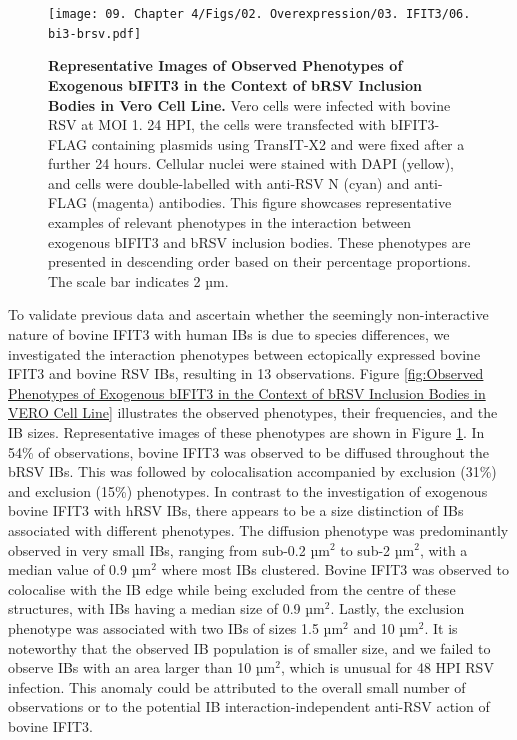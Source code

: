 \begin{figure}
    \centering
    \texttt{[image: 09. Chapter 4/Figs/02. Overexpression/03. IFIT3/06. bi3-brsv.pdf]}
    \caption[Representative Images of Observed Phenotypes of Exogenous bIFIT3 in the Context of bRSV Inclusion Bodies in Vero Cell Line.]{\textbf{Representative Images of Observed Phenotypes of Exogenous bIFIT3 in the Context of bRSV Inclusion Bodies in Vero Cell Line.} Vero cells were infected with bovine RSV at MOI 1. 24 HPI, the cells were transfected with bIFIT3-FLAG containing plasmids using TransIT-X2 and were fixed after a further 24 hours. Cellular nuclei were stained with DAPI (yellow), and cells were double-labelled with anti-RSV N (cyan) and anti-FLAG (magenta) antibodies. This figure showcases representative examples of relevant phenotypes in the interaction between exogenous bIFIT3 and bRSV inclusion bodies. These phenotypes are presented in descending order based on their percentage proportions. The scale bar indicates 2 µm.}
    \label{fig:Representative Images of Observed Phenotypes of Exogenous bIFIT3 in the Context of bRSV Inclusion Bodies in VERO Cell Line}
\end{figure}

To validate previous data and ascertain whether the seemingly non-interactive nature of bovine IFIT3 with human IBs is due to species differences, we investigated the interaction phenotypes between ectopically expressed bovine IFIT3 and bovine RSV IBs, resulting in 13 observations. Figure \ref{fig:Observed Phenotypes of Exogenous bIFIT3 in the Context of bRSV Inclusion Bodies in VERO Cell Line} illustrates the observed phenotypes, their frequencies, and the IB sizes. Representative images of these phenotypes are shown in Figure \ref{fig:Representative Images of Observed Phenotypes of Exogenous bIFIT3 in the Context of bRSV Inclusion Bodies in VERO Cell Line}. In 54\% of observations, bovine IFIT3 was observed to be diffused throughout the bRSV IBs. This was followed by colocalisation accompanied by exclusion (31\%) and exclusion (15\%) phenotypes. In contrast to the investigation of exogenous bovine IFIT3 with hRSV IBs, there appears to be a size distinction of IBs associated with different phenotypes. The diffusion phenotype was predominantly observed in very small IBs, ranging from sub-0.2 \(\mbox{µm}^2\) to sub-2 \(\mbox{µm}^2\), with a median value of 0.9 \(\mbox{µm}^2\) where most IBs clustered. Bovine IFIT3 was observed to colocalise with the IB edge while being excluded from the centre of these structures, with IBs having a median size of 0.9 \(\mbox{µm}^2\). Lastly, the exclusion phenotype was associated with two IBs of sizes 1.5 \(\mbox{µm}^2\) and 10 \(\mbox{µm}^2\). It is noteworthy that the observed IB population is of smaller size, and we failed to observe IBs with an area larger than 10 \(\mbox{µm}^2\), which is unusual for 48 HPI RSV infection. This anomaly could be attributed to the overall small number of observations or to the potential IB interaction-independent anti-RSV action of bovine IFIT3.

